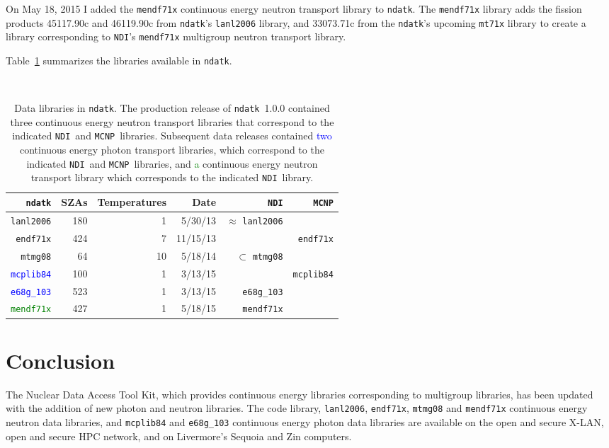 \documentclass[12pt]{lamemo}
\newcommand{\ndatk}{\texttt{ndatk}}
\newcommand{\NDI}{\texttt{NDI}}
\newcommand{\MCNP}{\texttt{MCNP}}
\begin{document}
On May 18, 2015 I added the \texttt{mendf71x} continuous energy
neutron transport library to \ndatk.  The \texttt{mendf71x} library
adds the fission products 45117.90c and 46119.90c from \ndatk's
\texttt{lanl2006} library, and 33073.71c from the \ndatk's upcoming
\texttt{mt71x} library to create a library corresponding to \NDI's
\texttt{mendf71x}\cite{lee14} multigroup neutron transport library.

Table~\ref{tbl:data} summarizes the libraries available in \ndatk.
\begin{table}\centering

\caption{Data libraries in \ndatk.  The production release of
  \ndatk\ 1.0.0 contained three continuous energy neutron transport
  libraries that correspond to the indicated \NDI\ and
  \MCNP\ libraries.  Subsequent data releases contained
  \textcolor{blue}{two} continuous energy photon transport libraries,
  which correspond to the indicated \NDI\ and \MCNP\ libraries, and
  \textcolor{green}{a} continuous energy neutron transport library
  which corresponds to the indicated \NDI\ library.} \label{tbl:data}
\mbox{}\\
\begin{tabular}{rrrr|rr}\hline
\ndatk & SZAs & Temperatures & Date & \NDI & \MCNP \\ \hline
\texttt{lanl2006} & 180 & 1 & 5/30/13 & $\approx$ \texttt{lanl2006} & \\
\texttt{endf71x} & 424 & 7 & 11/15/13 & & \texttt{endf71x} \\
\texttt{mtmg08} & 64 & 10 & 5/18/14 & $\subset$ \texttt{mtmg08} \\ \hline
\textcolor{blue}{\texttt{mcplib84}} & 100 & 1 & 3/13/15 &  & \texttt{mcplib84}\\
\textcolor{blue}{\texttt{e68g\_103}} & 523 & 1 & 3/13/15 & \texttt{e68g\_103} &\\ \hline
\textcolor{green}{\texttt{mendf71x}} & 427 & 1 & 5/18/15 & \texttt{mendf71x} & 
\end{tabular}
\end{table}

\section{Conclusion}

The Nuclear Data Access Tool Kit, which provides continuous energy
libraries corresponding to multigroup libraries, has been updated
with the addition of new photon and neutron libraries.  The
code library, \texttt{lanl2006}, \texttt{endf71x}, \texttt{mtmg08} and
\texttt{mendf71x} continuous energy neutron data libraries, and
\texttt{mcplib84} and \texttt{e68g\_103} continuous energy photon data
libraries are available on the open and secure X-LAN, open and secure
HPC network, and on Livermore's Sequoia and Zin computers.
\end{document}
